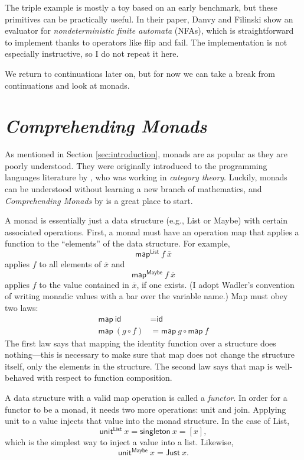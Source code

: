 \documentclass[acmsmall, nonacm, screen]{acmart}
\newcommand{\map}[3]{\textsf{map}^{\textsf{#1}}~#2~#3}
\newcommand{\unit}[2]{\textsf{unit}^{\textsf{#1}}~#2}
\begin{document}
The \textsf{triple} example is mostly a toy based on an early benchmark, but these primitives can
be practically useful. In their paper, Danvy and Filinski show an evaluator for {\em
nondeterministic finite automata} (NFAs), which is straightforward to implement thanks to
operators like \textsf{flip} and \textsf{fail}. The implementation is not especially instructive,
so I do not repeat it here.

We return to continuations later on, but for now we can take a break from continuations and look
at monads.

\section{{\em Comprehending Monads}} \label{sec:wadler}
As mentioned in Section \ref{sec:introduction}, monads are as popular as they are poorly
understood. They were originally introduced to the programming languages literature by
\citet{moggi1991notions}, who was working in {\em category theory}. Luckily, monads can be
understood without learning a new branch of mathematics, and {\em Comprehending Monads} by
\citet{wadler1990comprehending} is a great place to start.

A monad is essentially just a data structure (e.g., \textsf{List} or \textsf{Maybe}) with certain
associated operations. First, a monad must have an operation \textsf{map} that applies a function
to the ``elements'' of the data structure. For example,
\[ \map{List}{f}{\overline{x}} \]
applies $f$ to all elements of $\overline{x}$ and 
\[ \map{Maybe}{f}{\overline{x}} \]
applies $f$ to the value contained in $\overline{x}$, if one exists. (I adopt Wadler's convention
of writing monadic values with a bar over the variable name.) Map must obey two laws:
\begin{align*}
  \textsf{map}~\textsf{id} &= \textsf{id} \\
  \textsf{map}~(g \circ f) &= \textsf{map}~g \circ \textsf{map}~f
\end{align*}
The first law says that mapping the identity function over a structure does nothing---this is
necessary to make sure that \textsf{map} does not change the structure itself, only the elements
in the structure. The second law says that \textsf{map} is well-behaved with respect to function
composition.

A data structure with a valid \textsf{map} operation is called a {\em functor}. In order for a
functor to be a monad, it needs two more operations: \textsf{unit} and \textsf{join}. Applying
\textsf{unit} to a value injects that value into the monad structure. In the case of
\textsf{List},
\[ \unit{List}{x} = \textsf{singleton}~x = [x], \]
which is the simplest way to inject a value into a list. Likewise,
\[ \unit{Maybe}{x} = \textsf{Just}~x. \]
\end{document}
